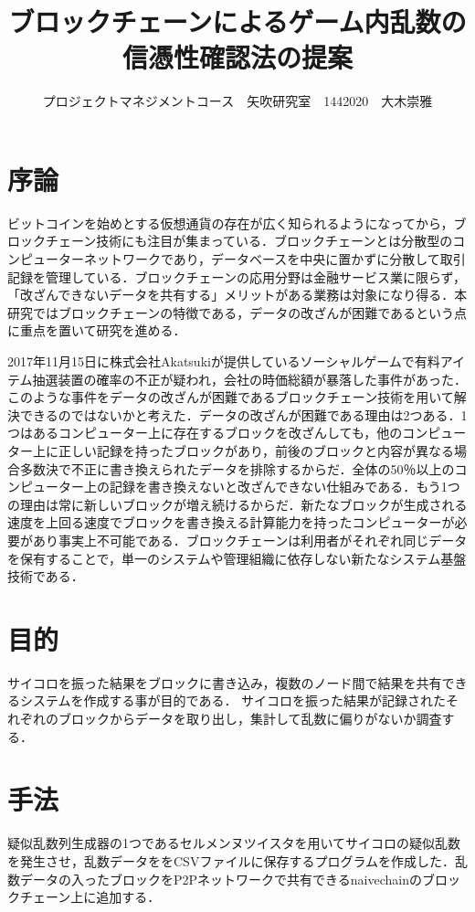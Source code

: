 \documentclass[uplatex,twocolumn,dvipdfmx]{jsarticle}
\title{\vspace{-5mm}\fontsize{14pt}{0pt}\selectfont ブロックチェーンによるゲーム内乱数の信憑性確認法の提案}
\author{\normalsize プロジェクトマネジメントコース　矢吹研究室　1442020　大木崇雅}
\date{}
\begin{document}
\fontsize{10.5pt}{\baselineskip}\selectfont
\maketitle





\section{序論}

ビットコインを始めとする仮想通貨の存在が広く知られるようになってから，ブロックチェーン技術にも注目が集まっている．ブロックチェーンとは分散型のコンピューターネットワークであり，データベースを中央に置かずに分散して取引記録を管理している\cite{a}．ブロックチェーンの応用分野は金融サービス業に限らず，「改ざんできないデータを共有する」メリットがある業務は対象になり得る．本研究ではブロックチェーンの特徴である，データの改ざんが困難であるという点に重点を置いて研究を進める．

2017年11月15日に株式会社Akatsukiが提供しているソーシャルゲームで有料アイテム抽選装置の確率の不正が疑われ，会社の時価総額が暴落した事件があった．このような事件をデータの改ざんが困難であるブロックチェーン技術を用いて解決できるのではないかと考えた．データの改ざんが困難である理由は2つある．1つはあるコンピューター上に存在するブロックを改ざんしても，他のコンピューター上に正しい記録を持ったブロックがあり，前後のブロックと内容が異なる場合多数決で不正に書き換えられたデータを排除するからだ．全体の50％以上のコンピューター上の記録を書き換えないと改ざんできない仕組みである\cite{c}．もう1つの理由は常に新しいブロックが増え続けるからだ．新たなブロックが生成される速度を上回る速度でブロックを書き換える計算能力を持ったコンピューターが必要があり事実上不可能である．ブロックチェーンは利用者がそれぞれ同じデータを保有することで，単一のシステムや管理組織に依存しない新たなシステム基盤技術である．


\section{目的}
サイコロを振った結果をブロックに書き込み，複数のノード間で結果を共有できるシステムを作成する事が目的である．
サイコロを振った結果が記録されたそれぞれのブロックからデータを取り出し，集計して乱数に偏りがないか調査する．

\section{手法}
疑似乱数列生成器の1つであるセルメンヌツイスタを用いてサイコロの疑似乱数を発生させ，乱数データををCSVファイルに保存するプログラムを作成した．乱数データの入ったブロックをP2Pネットワークで共有できるnaivechainのブロックチェーン上に追加する．
\end{document}
